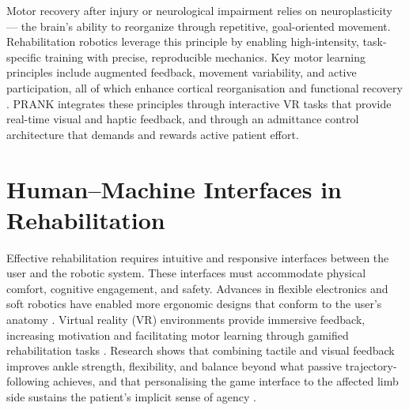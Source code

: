 Motor recovery after injury or neurological impairment relies on neuroplasticity — the brain's ability to reorganize through repetitive, goal-oriented movement.
Rehabilitation robotics leverage this principle by enabling high-intensity, task-specific training with precise, reproducible mechanics.
Key motor learning principles include augmented feedback, movement variability, and active participation, all of which enhance cortical reorganisation and functional recovery \cite{physiopedia2024, neuability2024}.
PRANK integrates these principles through interactive VR tasks that provide real-time visual and haptic feedback, and through an admittance control architecture that demands and rewards active patient effort.

\section{Human--Machine Interfaces in Rehabilitation}

Effective rehabilitation requires intuitive and responsive interfaces between the user and the robotic system.
These interfaces must accommodate physical comfort, cognitive engagement, and safety.
Advances in flexible electronics and soft robotics have enabled more ergonomic designs that conform to the user's anatomy \cite{gao2021flexible}.
Virtual reality (VR) environments provide immersive feedback, increasing motivation and facilitating motor learning through gamified rehabilitation tasks \cite{frontiers2021interfaces}.
Research shows that combining tactile and visual feedback improves ankle strength, flexibility, and balance beyond what passive trajectory-following achieves, and that personalising the game interface to the affected limb side sustains the patient's implicit sense of agency \cite{Medved2021}.

